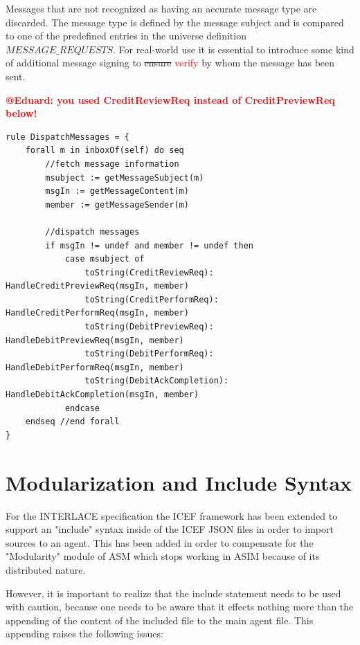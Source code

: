 Messages that are not recognized as having an accurate message type are discarded. The message type is defined by the message subject and is compared to one of the predefined entries in the universe definition $MESSAGE\_REQUESTS$. For real-world use it is essential to introduce some kind of additional message signing to \st{ensure} \textcolor{red}{verify} by whom the message has been sent.

\textcolor{red}{\bf @Eduard: you used CreditReviewReq  instead of CreditPreviewReq below!} 

\begin{center}
\begin{minipage}{0.8\textwidth}
\small
\begin{lstlisting}[language=bsl_lst,caption={\bf\small Server message dispatching},label={lst:impl-msg-dispatch} ]
rule DispatchMessages = {
	forall m in inboxOf(self) do seq
		//fetch message information
		msubject := getMessageSubject(m)
		msgIn := getMessageContent(m)
		member := getMessageSender(m)
		
		//dispatch messages
		if msgIn != undef and member != undef then
			case msubject of
				toString(CreditReviewReq): HandleCreditPreviewReq(msgIn, member)
				toString(CreditPerformReq): HandleCreditPerformReq(msgIn, member)
				toString(DebitPreviewReq): HandleDebitPreviewReq(msgIn, member)
				toString(DebitPerformReq): HandleDebitPerformReq(msgIn, member)
				toString(DebitAckCompletion): HandleDebitAckCompletion(msgIn, member)
			endcase
	endseq //end forall
}
\end{lstlisting}
\end{minipage}
\end{center}

\section{Modularization and Include Syntax}
\label{sec:impl-include}

For the INTERLACE specification the ICEF framework has been extended to support an "include" syntax inside of the ICEF JSON files in order to import sources to an agent. This has been added in order to compensate for the "Modularity" module of ASM which stops working in ASIM because of its distributed nature.

However, it is important to realize that the include statement needs to be used with caution, because one needs to be aware that it effects nothing more than the appending of the content of the included file to the main agent file. This appending raises the following issues:

